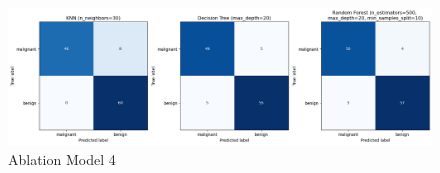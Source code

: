 \documentclass[letterpaper]{article}
\begin{document}
	\begin{figure}[H]
		\centering
		\includegraphics[width=1\linewidth]{figures/5}
		\caption{Ablation Model 4}
		\label{fig:5}
	\end{figure}
	
\end{document}
